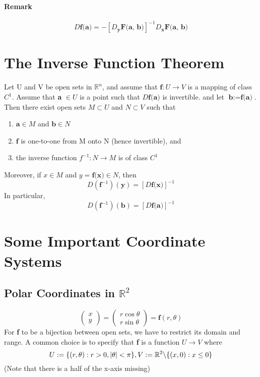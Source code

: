 \documentclass[11pt]{article}
\newcommand{\tb}[1]{\textbf{#1}}
\newcommand{\real}[0]{\mathbb{R}}
\newcommand{\func}[3]{\tb{#1}: {#2} \rightarrow {#3} }
\begin{document}
\paragraph{Remark} $$D\tb{f(a)} = -[D_\tb{y}\tb{F(a, b)}]^{-1}D_\tb{x}\tb{F(a, b)}$$
\section{The Inverse Function Theorem} Let U and V be open sets in $\real^n$, and assume that $\func{f}{U}{V}$ is a mapping of class $C^1$. \newline
Assume that \tb{a} $\in U$ is a point such that $D\tb{f(a)}$ is invertible. \newline
and let $\tb{b} := \tb{f(a)}$. Then there exist open sets $M \subset U$ and $N \subset V$ such that
\begin{enumerate}
    \item $\tb{a} \in M$ and $\tb{b} \in N$
    \item $\tb{f}$ is one-to-one from M onto N (hence invertible), and
    \item the inverse function $f^{-1}: N \rightarrow M$ is of class $C^1$
\end{enumerate}
Moreover, if $x \in M$ and $y = \tb{f(x)}\in N$, then $$D(\tb{f}^{-1})(\tb{y}) = [D\tb{f(x)}]^{-1}$$
In particular, $$D(\tb{f}^{-1})(\tb{b}) = [D\tb{f(a)}]^{-1}$$

\section{Some Important Coordinate Systems}
\subsection{Polar Coordinates in $\real^2$}
$$\begin{pmatrix}
	x\\y
\end{pmatrix}
= \begin{pmatrix}
	r\cos{\theta}\\
	r\sin{\theta}
\end{pmatrix}
= \tb{f}(r, \theta) $$
For \tb{f} to be a bijection between open sets, we have to restrict its domain and range. A common choice is to specify that \tb{f} is a function $U \rightarrow V$ where
$$U := \{(r, \theta): r > 0, |\theta| < \pi\},   V:= \real^2 \symbol{92}\{(x, 0): x \leq 0 \}$$
(Note that there is a half of the x-axis missing)
\end{document}
